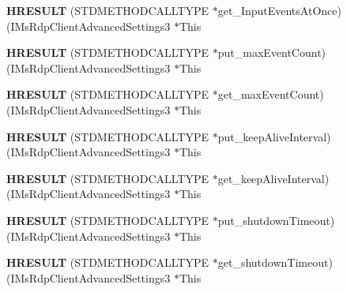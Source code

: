 \begin{DoxyCompactItemize}
{\bfseries H\+R\+E\+S\+U\+LT} (S\+T\+D\+M\+E\+T\+H\+O\+D\+C\+A\+L\+L\+T\+Y\+PE $\ast$get\+\_\+\+Input\+Events\+At\+Once)(I\+Ms\+Rdp\+Client\+Advanced\+Settings3 $\ast$This
\item 
\mbox{\label{struct_i_ms_rdp_client_advanced_settings3_vtbl_afa593f3fa4020f911058706b3273a61a}} 
{\bfseries H\+R\+E\+S\+U\+LT} (S\+T\+D\+M\+E\+T\+H\+O\+D\+C\+A\+L\+L\+T\+Y\+PE $\ast$put\+\_\+max\+Event\+Count)(I\+Ms\+Rdp\+Client\+Advanced\+Settings3 $\ast$This
\item 
\mbox{\label{struct_i_ms_rdp_client_advanced_settings3_vtbl_ad8d6f055ea90bcc8280af167a0eaac22}} 
{\bfseries H\+R\+E\+S\+U\+LT} (S\+T\+D\+M\+E\+T\+H\+O\+D\+C\+A\+L\+L\+T\+Y\+PE $\ast$get\+\_\+max\+Event\+Count)(I\+Ms\+Rdp\+Client\+Advanced\+Settings3 $\ast$This
\item 
\mbox{\label{struct_i_ms_rdp_client_advanced_settings3_vtbl_a25128a4f72cf31fb0c02a0b31561daf7}} 
{\bfseries H\+R\+E\+S\+U\+LT} (S\+T\+D\+M\+E\+T\+H\+O\+D\+C\+A\+L\+L\+T\+Y\+PE $\ast$put\+\_\+keep\+Alive\+Interval)(I\+Ms\+Rdp\+Client\+Advanced\+Settings3 $\ast$This
\item 
\mbox{\label{struct_i_ms_rdp_client_advanced_settings3_vtbl_a9f9b281c78d9715eb9be082c8ead9152}} 
{\bfseries H\+R\+E\+S\+U\+LT} (S\+T\+D\+M\+E\+T\+H\+O\+D\+C\+A\+L\+L\+T\+Y\+PE $\ast$get\+\_\+keep\+Alive\+Interval)(I\+Ms\+Rdp\+Client\+Advanced\+Settings3 $\ast$This
\item 
\mbox{\label{struct_i_ms_rdp_client_advanced_settings3_vtbl_a08d1384356cc7e296c0045b839e8252c}} 
{\bfseries H\+R\+E\+S\+U\+LT} (S\+T\+D\+M\+E\+T\+H\+O\+D\+C\+A\+L\+L\+T\+Y\+PE $\ast$put\+\_\+shutdown\+Timeout)(I\+Ms\+Rdp\+Client\+Advanced\+Settings3 $\ast$This
\item 
\mbox{\label{struct_i_ms_rdp_client_advanced_settings3_vtbl_a42769f591aef9e8646a229ab1751a8fe}} 
{\bfseries H\+R\+E\+S\+U\+LT} (S\+T\+D\+M\+E\+T\+H\+O\+D\+C\+A\+L\+L\+T\+Y\+PE $\ast$get\+\_\+shutdown\+Timeout)(I\+Ms\+Rdp\+Client\+Advanced\+Settings3 $\ast$This
\item 

\end{DoxyCompactItemize}
